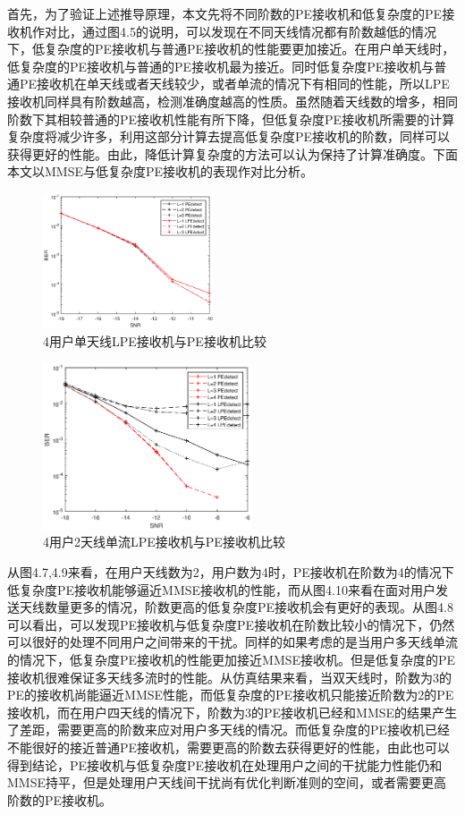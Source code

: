 \documentclass[bachelor,nocolorlinks, printoneside]{seuthesis} %
\begin{document}
\begin{Main}
首先，为了验证上述推导原理，本文先将不同阶数的PE接收机和低复杂度的PE接收机作对比，通过图4.5的说明，可以发现在不同天线情况都有阶数越低的情况下，低复杂度的PE接收机与普通PE接收机的性能要更加接近。在用户单天线时，低复杂度的PE接收机与普通的PE接收机最为接近。同时低复杂度PE接收机与普通PE接收机在单天线或者天线较少，或者单流的情况下有相同的性能，所以LPE接收机同样具有阶数越高，检测准确度越高的性质。虽然随着天线数的增多，相同阶数下其相较普通的PE接收机性能有所下降，但低复杂度PE接收机所需要的计算复杂度将减少许多，利用这部分计算去提高低复杂度PE接收机的阶数，同样可以获得更好的性能。由此，降低计算复杂度的方法可以认为保持了计算准确度。下面本文以MMSE与低复杂度PE接收机的表现作对比分析。
\begin{figure}[htbp!]
	\centering \includegraphics[width=0.45\textwidth]{img/4_5.eps} \caption{4用户单天线LPE接收机与PE接收机比较}
\end{figure}
\begin{figure}[htbp!]
	\centering \includegraphics[width=0.55\textwidth]{img/4_6.eps} \caption{4用户2天线单流LPE接收机与PE接收机比较}
\end{figure}

从图4.7,4.9来看，在用户天线数为2，用户数为4时，PE接收机在阶数为4的情况下低复杂度PE接收机能够逼近MMSE接收机的性能，而从图4.10来看在面对用户发送天线数量更多的情况，阶数更高的低复杂度PE接收机会有更好的表现。从图4.8可以看出，可以发现PE接收机与低复杂度PE接收机在阶数比较小的情况下，仍然可以很好的处理不同用户之间带来的干扰。同样的如果考虑的是当用户多天线单流的情况下，低复杂度PE接收机的性能更加接近MMSE接收机。但是低复杂度的PE接收机很难保证多天线多流时的性能。从仿真结果来看，当双天线时，阶数为3的PE的接收机尚能逼近MMSE性能，而低复杂度的PE接收机只能接近阶数为2的PE接收机，而在用户四天线的情况下，阶数为3的PE接收机已经和MMSE的结果产生了差距，需要更高的阶数来应对用户多天线的情况。而低复杂度的PE接收机已经不能很好的接近普通PE接收机，需要更高的阶数去获得更好的性能，由此也可以得到结论，PE接收机与低复杂度PE接收机在处理用户之间的干扰能力性能仍和MMSE持平，但是处理用户天线间干扰尚有优化判断准则的空间，或者需要更高阶数的PE接收机。


\end{Main}
\end{document}
